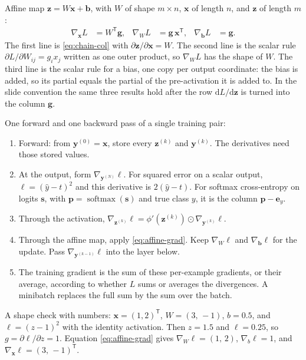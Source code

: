 \documentclass[11pt]{article}
\begin{document}
Affine map $\mathbf{z}=W\mathbf{x}+\mathbf{b}$, with $W$ of shape $m\times n$, $\mathbf{x}$ of length $n$, and $\mathbf{z}$ of length $m$:
\begin{align}
\nabla_{\mathbf{x}}L&=W^{\mathsf T}\mathbf{g},
&
\nabla_W L&=\mathbf{g}\,\mathbf{x}^{\mathsf T},
&
\nabla_{\mathbf{b}}L&=\mathbf{g}.
\label{eq:affine-grad}
\end{align}
The first line is \eqref{eq:chain-col} with $\partial\mathbf{z}/\partial\mathbf{x}=W$. The second line is the scalar rule $\partial L/\partial W_{ij}=g_i x_j$ written as one outer product, so $\nabla_W L$ has the shape of $W$. The third line is the scalar rule for a bias, one copy per output coordinate: the bias is added, so its partial equals the partial of the pre-activation it is added to. In the slide convention the same three results hold after the row $\mathrm{d}L/\mathrm{d}\mathbf{z}$ is turned into the column $\mathbf{g}$.

One forward and one backward pass of a single training pair:
\begin{enumerate}
\item Forward: from $\mathbf{y}^{(0)}=\mathbf{x}$, store every $\mathbf{z}^{(k)}$ and $\mathbf{y}^{(k)}$. The derivatives need those stored values.
\item At the output, form $\nabla_{\mathbf{y}^{(N)}}\ell$. For squared error on a scalar output, $\ell=(\hat y-t)^2$ and this derivative is $2(\hat y-t)$. For softmax cross-entropy on logits $\mathbf{s}$, with $\mathbf{p}=\operatorname{softmax}(\mathbf{s})$ and true class $y$, it is the column $\mathbf{p}-\mathbf{e}_y$.
\item Through the activation, $\nabla_{\mathbf{z}^{(k)}}\ell=\phi'(\mathbf{z}^{(k)})\odot\nabla_{\mathbf{y}^{(k)}}\ell$.
\item Through the affine map, apply \eqref{eq:affine-grad}. Keep $\nabla_W\ell$ and $\nabla_{\mathbf{b}}\ell$ for the update. Pass $\nabla_{\mathbf{y}^{(k-1)}}\ell$ into the layer below.
\item The training gradient is the sum of these per-example gradients, or their average, according to whether $L$ sums or averages the divergences. A minibatch replaces the full sum by the sum over the batch.
\end{enumerate}

A shape check with numbers: $\mathbf{x}=(1,2)^{\mathsf T}$, $W=(3,\,-1)$, $b=0.5$, and $\ell=(z-1)^2$ with the identity activation. Then $z=1.5$ and $\ell=0.25$, so $g=\partial\ell/\partial z=1$. Equation \eqref{eq:affine-grad} gives $\nabla_W\ell=(1,\,2)$, $\nabla_b\ell=1$, and $\nabla_{\mathbf{x}}\ell=(3,\,-1)^{\mathsf T}$.
\end{document}
